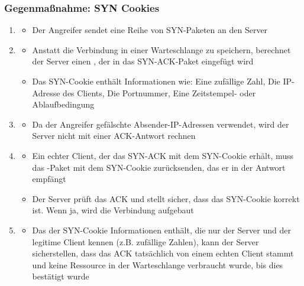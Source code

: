 \subsubsection*{Gegenmaßnahme: SYN Cookies}
\begin{infoBox}[title=Ablauf mit SYN Cookies]
    \begin{enumerate}
        \item {}
        \begin{itemize}
            \item Der Angreifer sendet eine Reihe von SYN-Paketen an den Server
        \end{itemize}
        \item {}
        \begin{itemize}
            \item Anstatt die Verbindung in einer Warteschlange zu speichern, berechnet der Server einen , der in das SYN-ACK-Paket eingefügt wird
            \item Das SYN-Cookie enthält Informationen wie: Eine zufällige Zahl, Die IP-Adresse des Clients, Die Portnummer, Eine Zeitstempel- oder Ablaufbedingung
        \end{itemize}
        \item {}
        \begin{itemize}
            \item Da der Angreifer gefälschte Absender-IP-Adressen verwendet, wird der Server nicht mit einer ACK-Antwort rechnen
        \end{itemize}
        \item {}
        \begin{itemize}
            \item Ein echter Client, der das SYN-ACK mit dem SYN-Cookie erhält, muss das -Paket mit dem SYN-Cookie zurücksenden, das er in der Antwort empfängt
            \item Der Server prüft das ACK und stellt sicher, dass das SYN-Cookie korrekt ist. Wenn ja, wird die Verbindung aufgebaut
        \end{itemize}
        \item {}
        \begin{itemize}
            \item Das der SYN-Cookie Informationen enthält, die nur der Server und der legitime Client kennen (z.B. zufällige Zahlen), kann der Server sicherstellen, dass das ACK tatsächlich von einem echten Client stammt und keine Ressource in der Warteschlange verbraucht wurde, bis dies bestätigt wurde
        \end{itemize}
    \end{enumerate}
\end{infoBox}
